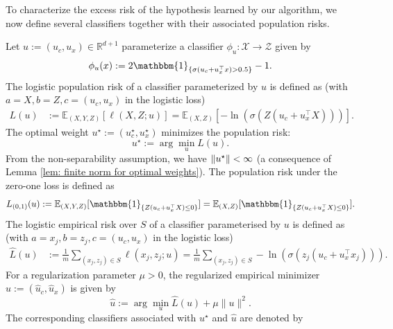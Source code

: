 To characterize the excess risk of the hypothesis learned by our algorithm, we now define several classifiers together with their associated population risks.

Let $u := (u_c, u_x) \in \mathbb{R}^{d+1}$ parameterize a classifier $ \phi_u: \mathcal{X} \rightarrow \mathcal{Z}$ given by
\begin{equation*}\phi_u(x) := 2\mathbbm{1}_{\{\sigma(u_c + u_x^\top x) > 0.5\}} - 1.
\end{equation*}
The logistic population risk of a classifier parameterized by $u$ is defined as (with $a = X, b= Z, c = (u_c, u_x)$ in the logistic loss)
\begin{equation*}\label{eqn: Logistic risk small}
\begin{aligned}
    L(u) &:= \mathbb{E}_{(X, Y, Z)}[\ell(X, Z; u)]=\mathbb{E}_{(X, Z)}[-\ln(\sigma(Z(u_c + u_x^\top X)))].
\end{aligned}
\end{equation*}
The optimal weight $u^\star := (u^\star_c, u^\star_x)$ minimizes the population risk:
\begin{equation}\label{eqn: u star}
    u^\star := \arg\min_u L(u).
\end{equation}
From the non-separability assumption, we have $\lVert u^\star \rVert < \infty$ (a consequence of Lemma \ref{lem: finite norm for optimal weights}).
The
population risk under the zero-one loss is defined as
\begin{equation*}\label{{eqn: zero-one risk}}
    L_{(0,1)}(u) := \E_{(X,Y,Z)}[\mathbbm{1}_{\{Z(u_c + u_x^\top X) \leq 0 \}}] = \E_{(X,Z)}[\mathbbm{1}_{\{Z(u_c + u_x^\top X) \leq 0 \}}] .
\end{equation*}
The logistic empirical risk over $S$ of a classifier parameterised by $u$ is defined as (with $a = x_j, b= z_j, c = (u_c, u_x)$ in the logistic loss)
\begin{equation*}
\begin{aligned}
    \hat{L}(u) &:= \frac{1}{m} \sum_{(x_j, z_j) \in S} \ell(x_j, z_j; u) = \frac{1}{m} \sum_{(x_j, z_j) \in S}-\ln(\sigma(z_j(u_c + u_x^\top x_j))).
\end{aligned}
\end{equation*}
For a regularization parameter $\mu > 0$, the regularized empirical minimizer $\hat{u} := (\hat{u}_c, \hat{u}_x)$ is given by
\begin{equation}\label{eqn: u hat}
    \hat{u} := \arg\min_u \hat{L}(u) + \mu \lVert u \rVert^2.
\end{equation}
The corresponding classifiers associated with $u^\star$ and $\hat{u}$ are denoted by
